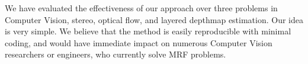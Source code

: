 We have evaluated the effectiveness of our approach over three problems
in Computer Vision, stereo, optical flow, and layered
depthmap estimation.
%
Our idea is very simple. We believe that the method is easily
reproducible with minimal coding, and would have immediate impact on
numerous Computer Vision researchers or engineers, who currently solve
MRF problems.


%
%


%



%



%





